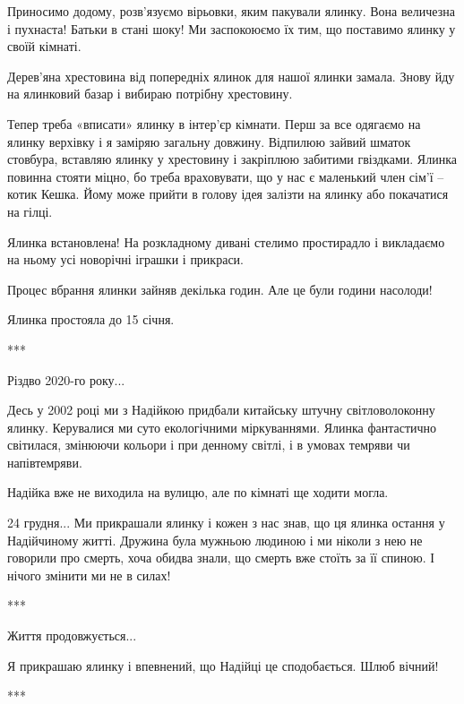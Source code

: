 
Приносимо додому, розв’язуємо вірьовки, яким пакували ялинку. Вона величезна і
пухнаста! Батьки в стані шоку! Ми заспокоюємо їх тим, що поставимо ялинку у
своїй кімнаті.


Дерев’яна хрестовина від попередніх ялинок для нашої ялинки замала. Знову йду
на ялинковий базар і вибираю потрібну хрестовину. 

Тепер треба «вписати» ялинку в інтер’єр кімнати. Перш за все одягаємо на ялинку
верхівку і я заміряю загальну довжину. Відпилюю зайвий шматок стовбура,
вставляю ялинку у хрестовину і закріплюю забитими гвіздками. Ялинка повинна
стояти міцно, бо треба враховувати, що у нас є маленький член сім’ї – котик
Кешка. Йому може прийти в голову ідея залізти на ялинку або покачатися на
гілці. 


Ялинка встановлена! На розкладному дивані стелимо простирадло і викладаємо на
ньому усі новорічні іграшки і прикраси. 

Процес вбрання ялинки зайняв декілька годин. Але це були години насолоди!

Ялинка простояла до 15 січня.


***

Різдво 2020-го року...

Десь у 2002 році ми з Надійкою придбали китайську штучну світловолоконну
ялинку. Керувалися ми суто екологічними міркуваннями. Ялинка фантастично
світилася, змінюючи кольори і при денному світлі, і в умовах темряви чи
напівтемряви. 


Надійка вже не виходила на вулицю, але по кімнаті ще ходити могла. 

24 грудня... Ми прикрашали ялинку і кожен з нас знав, що ця ялинка остання у
Надійчиному житті. Дружина була мужньою людиною і ми ніколи з нею не говорили
про смерть, хоча обидва знали, що смерть вже стоїть за її спиною. І нічого
змінити ми не в силах!


***

Життя продовжується... 

Я прикрашаю ялинку і впевнений, що Надійці це сподобається. Шлюб вічний!

***

